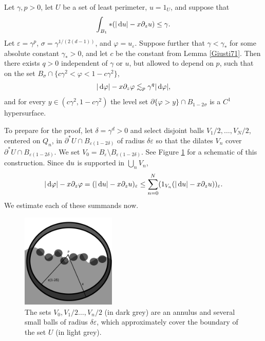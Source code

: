 \begin{lemma}\label{main mollifier lemma}
Let $\gamma, p > 0$, let $U$ be a set of least perimeter, $u = 1_U$, and suppose that
\begin{equation}\label{hypothesis on main mollifier lemma}
\int_{B_1} *(|\mathop{}\!\mathrm{d} u| - x\partial_z u) \leq \gamma.
\end{equation}
Let $\varepsilon = \gamma^p$, $\sigma = \gamma^{1/(2(d - 1))}$, and $\varphi = u_\varepsilon$.
Suppose further that $\gamma < \gamma_*$ for some absolute constant $\gamma_* > 0$, and let $c$ be the constant from Lemma \ref{Giusti71}.
Then there exists $q > 0$ independent of $\gamma$ or $u$, but allowed to depend on $p$, such that on the set $B_\sigma \cap \{c\gamma^2 < \varphi < 1 - c\gamma^2\}$,
\begin{equation}\label{claim on main mollifier lemma}
|\mathop{}\!\mathrm{d} \varphi| - x\partial_z \varphi \lesssim_p \gamma^q |\mathop{}\!\mathrm{d} \varphi|,
\end{equation}
and for every $y \in (c\gamma^2, 1 - c\gamma^2)$ the level set $\partial \{\varphi > y\} \cap B_{1 - 2\sigma}$ is a $C^1$ hypersurface.
\end{lemma}

To prepare for the proof, let $\delta = \gamma^d > 0$ and select disjoint balls $V_1/2, \dots, V_N/2$, centered on $Q_n$, in $\partial^* U \cap B_{\varepsilon(1 - 2\delta)}$ of radius $\delta\varepsilon$ so that the dilates $V_n$ cover $\partial^* U \cap B_{\varepsilon(1 - 2\delta)}$.
We set $V_0 = B_\varepsilon \setminus B_{\varepsilon(1 - 2\delta)}$.
See Figure \ref{covering diagram} for a schematic of this construction.
Since $\mathop{}\!\mathrm{d} u$ is supported in $\bigcup_n V_n$,
$$|\mathop{}\!\mathrm{d} \varphi| - x\partial_z \varphi = (|\mathop{}\!\mathrm{d} u| - x\partial_zu)_\varepsilon \leq \sum_{n=0}^N (1_{V_n}(|\mathop{}\!\mathrm{d} u| - x\partial_zu))_\varepsilon.$$
We estimate each of these summands now.

\begin{figure}[ht]\label{covering diagram}
\caption{The sets $V_0, V_1/2 \dots, V_n/2$ (in dark grey) are an annulus and several small balls of radius $\delta \varepsilon$, which approximately cover the boundary of the set $U$ (in light grey).}
\includegraphics[width=0.4\textwidth]{covering lemma}
\end{figure}

